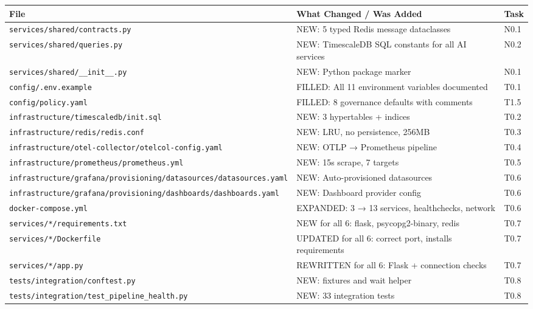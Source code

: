 \documentclass[12pt, a4paper]{article}
\begin{document}
\begin{center}
\begin{tabularx}{\textwidth}{lXl}
  \toprule
  \textbf{File} & \textbf{What Changed / Was Added} & \textbf{Task} \\
  \midrule
  \texttt{services/shared/contracts.py} & NEW: 5 typed Redis message dataclasses & N0.1 \\
  \texttt{services/shared/queries.py}   & NEW: TimescaleDB SQL constants for all AI services & N0.2 \\
  \texttt{services/shared/\_\_init\_\_.py} & NEW: Python package marker & N0.1 \\
  \midrule
  \texttt{config/.env.example} & FILLED: All 11 environment variables documented & T0.1 \\
  \texttt{config/policy.yaml}  & FILLED: 8 governance defaults with comments & T1.5 \\
  \midrule
  \texttt{infrastructure/timescaledb/init.sql} & NEW: 3 hypertables + indices & T0.2 \\
  \texttt{infrastructure/redis/redis.conf}      & NEW: LRU, no persistence, 256MB & T0.3 \\
  \texttt{infrastructure/otel-collector/otelcol-config.yaml} & NEW: OTLP → Prometheus pipeline & T0.4 \\
  \texttt{infrastructure/prometheus/prometheus.yml} & NEW: 15s scrape, 7 targets & T0.5 \\
  \texttt{infrastructure/grafana/provisioning/datasources/datasources.yaml} & NEW: Auto-provisioned datasources & T0.6 \\
  \texttt{infrastructure/grafana/provisioning/dashboards/dashboards.yaml}  & NEW: Dashboard provider config & T0.6 \\
  \midrule
  \texttt{docker-compose.yml} & EXPANDED: 3 → 13 services, healthchecks, network & T0.6 \\
  \midrule
  \texttt{services/*/requirements.txt} & NEW for all 6: flask, psycopg2-binary, redis & T0.7 \\
  \texttt{services/*/Dockerfile} & UPDATED for all 6: correct port, installs requirements & T0.7 \\
  \texttt{services/*/app.py} & REWRITTEN for all 6: Flask + connection checks & T0.7 \\
  \midrule
  \texttt{tests/integration/conftest.py}             & NEW: fixtures and wait helper & T0.8 \\
  \texttt{tests/integration/test\_pipeline\_health.py} & NEW: 33 integration tests & T0.8 \\

\end{tabularx}
\end{center}
\end{document}

